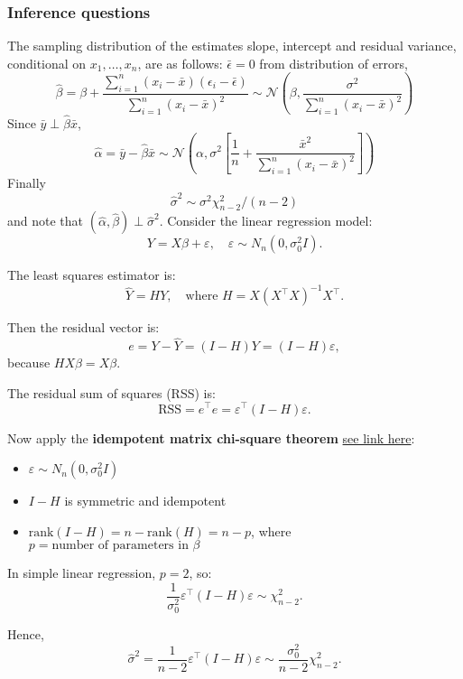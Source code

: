 \documentclass{article}
\begin{document}
\subsubsection{Inference questions}
The sampling distribution of the estimates slope, intercept and residual variance, conditional on $x_1, \ldots, x_n$, are as follows: $\bar{\epsilon} = 0$ from distribution of errors,
$$ \hat{\beta} = \beta + \frac{\sum_{i=1}^{n}(x_i - \bar{x})(\epsilon_i - \bar{\epsilon})}{\sum_{i=1}^{n}(x_i - \bar{x})^2} \sim \mathcal{N}\left(\beta, \frac{\sigma^2}{\sum_{i=1}^{n}(x_i - \bar{x})^2}\right)$$
Since $\bar{y} \perp \hat{\beta}\bar{x}$,
$$ \hat{\alpha} = \bar{y} - \hat{\beta}\bar{x} \sim \mathcal{N}\left(\alpha, \sigma^2\left[ \frac{1}{n} + \frac{\bar{x}^2}{\sum_{i=1}^{n}(x_i - \bar{x})^2}\right]\right) $$
Finally
$$ \hat{\sigma}^2 \sim \sigma^2 \chi^2_{n-2}/(n-2) $$
and note that $(\hat{\alpha}, \hat{\beta}) \perp \hat{\sigma}^2$.
Consider the linear regression model:
\[
  Y = X\beta + \varepsilon, \quad \varepsilon \sim N_n(0, \sigma_0^2 I).
\]

The least squares estimator is:
\[
  \hat{Y} = HY, \quad \text{where } H = X(X^\top X)^{-1}X^\top.
\]

Then the residual vector is:
\[
  e = Y - \hat{Y} = (I - H)Y = (I - H)\varepsilon,
\]
because \( HX\beta = X\beta \).

The residual sum of squares (RSS) is:
\[
  \text{RSS} = e^\top e = \varepsilon^\top (I - H)\varepsilon.
\]

Now apply the \textbf{idempotent matrix chi-square theorem} \href{https://www.statlect.com/probability-distributions/normal-distribution-quadratic-forms}{see link here}:

\begin{itemize}
  \item \( \varepsilon \sim N_n(0, \sigma_0^2 I) \)
  \item \( I - H \) is symmetric and idempotent
  \item \( \text{rank}(I - H) = n - \text{rank}(H) = n - p \), where \( p = \text{number of parameters in } \beta \)
\end{itemize}

In simple linear regression, \( p = 2 \), so:
\[
  \frac{1}{\sigma_0^2}\varepsilon^\top (I - H)\varepsilon \sim \chi^2_{n - 2}.
\]

Hence,
\[
  \hat{\sigma}^2 = \frac{1}{n - 2} \varepsilon^\top (I - H)\varepsilon \sim \frac{\sigma_0^2}{n - 2} \chi^2_{n - 2}.
\]\\
\end{document}
